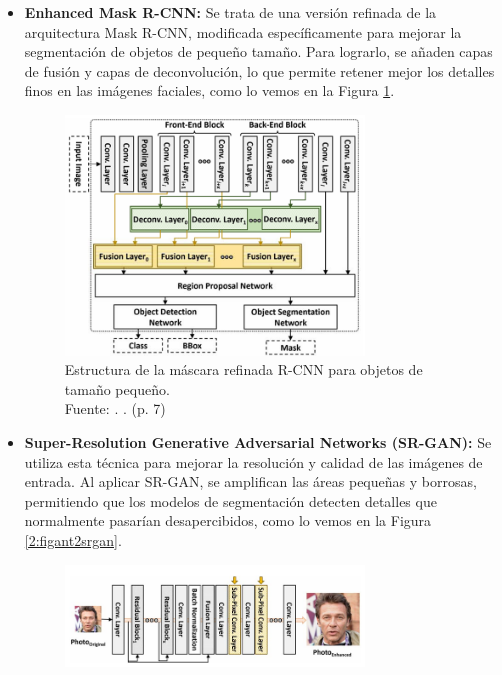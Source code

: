 \begin{itemize}
    \item \textbf{Enhanced Mask R-CNN:} Se trata de una versión refinada de la arquitectura Mask R-CNN, modificada específicamente para mejorar la segmentación de objetos de pequeño tamaño. Para lograrlo, se añaden capas de fusión y capas de deconvolución, lo que permite retener mejor los detalles finos en las imágenes faciales, como lo vemos en la Figura \ref{2:figant2rcnn}.
    \begin{figure}[H]
		\begin{center}
			\includegraphics[width=0.75\textwidth]{2/figures/estant2.png}
			\caption[Estructura de la máscara refinada R-CNN para objetos de tamaño pequeño]{Estructura de la máscara refinada R-CNN para objetos de tamaño pequeño.\\
				Fuente: \cite{Kim2023}. . (p. 7)}
			\label{2:figant2rcnn}
		\end{center}
	\end{figure}
	\item \textbf{Super-Resolution Generative Adversarial Networks (SR-GAN):} Se utiliza esta técnica para mejorar la resolución y calidad de las imágenes de entrada. Al aplicar SR-GAN, se amplifican las áreas pequeñas y borrosas, permitiendo que los modelos de segmentación detecten detalles que normalmente pasarían desapercibidos, como lo vemos en la Figura \ref{2:figant2srgan}.
    \begin{figure}[H]
		\begin{center}
			\includegraphics[width=0.75\textwidth]{2/figures/ant2srgan.png}

\end{center}
\end{figure}
\end{itemize}
